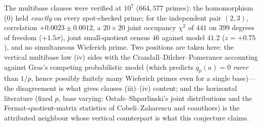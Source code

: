 \documentclass[11pt]{article}
\theoremstyle{definition}
\begin{document}
The multibase clauses were verified at $10^7$ ($664{,}577$ primes):
the homomorphism (0) held \emph{exactly} on every spot-checked prime;
for the independent pair $(2,3)$, correlation
$+0.0023\pm0.0012$, a $20\times20$ joint occupancy $\chi^2$ of
$441$ on $399$ degrees of freedom ($+1.5\sigma$), joint
small-quotient census $46$ against model $41.2$ ($z=+0.75$), and no
simultaneous Wieferich prime.  Two positions are taken here: the
vertical multibase law (iv) sides with the Crandall--Dilcher--Pomerance
accounting against Gras's competing probabilistic model (which
predicts $q_p(a)=0$ \emph{rarer} than $1/p$, hence possibly finitely
many Wieferich primes even for a single base)---the disagreement is what
gives clauses (iii)--(iv) content; and the horizontal
literature (fixed $p$, base varying: Ostafe--Shparlinski's joint
distributions and the Fermat-quotient-matrix statistics of
Cobeli--Zaharescu and coauthors) is the attributed neighbour whose
vertical counterpart is what this conjecture claims.
\end{document}
